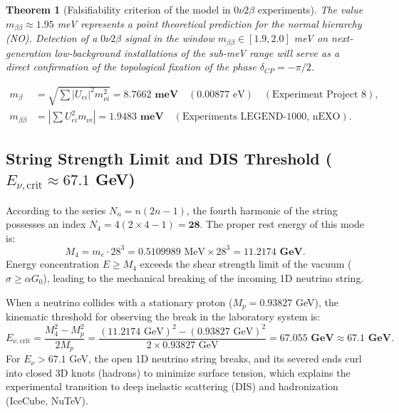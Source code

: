 \documentclass[12pt,a4paper]{article}
\newtheorem{theorem}{Theorem}
\begin{document}
	\begin{theorem}[Falsifiability criterion of the model in $0\nu 2\beta$ experiments]
	The value $m_{\beta\beta} \approx 1.95$ meV represents a point theoretical prediction for the normal hierarchy (NO). Detection of a $0\nu 2\beta$ signal in the window $m_{\beta\beta} \in [1.9, 2.0]$ meV on next-generation low-background installations of the sub-meV range will serve as a direct confirmation of the topological fixation of the phase $\delta_{CP} = -\pi/2$.
	\end{theorem}
	\begin{align}
	m_\beta &= \sqrt{\sum |U_{ei}|^2 m_{\nu i}^2} = \mathbf{8.7662 \text{ meV}} \quad (0.00877 \text{ eV}) \quad (\text{Experiment Project 8}), \\
	m_{\beta\beta} &= \left| \sum U_{ei}^2 m_{\nu i} \right| = \mathbf{1.9483 \text{ meV}} \quad (\text{Experiments LEGEND-1000, nEXO}).
	\end{align}
				
	\subsection{String Strength Limit and DIS Threshold ($E_{\nu, \text{crit}} \approx 67.1$ GeV)}
	According to the series $N_n = n(2n-1)$, the fourth harmonic of the string possesses an index $N_4 = 4(2 \times 4 - 1) = \mathbf{28}$. The proper rest energy of this mode is:
	\begin{equation}
	M_4 = m_e \cdot 28^3 = 0.5109989 \text{ MeV} \times 28^3 = \mathbf{11.2174 \text{ GeV}}.
	\end{equation}
	Energy concentration $E \ge M_4$ exceeds the shear strength limit of the vacuum ($\sigma \ge \alpha G_0$), leading to the mechanical breaking of the incoming 1D neutrino string. 
			
	When a neutrino collides with a stationary proton ($M_p = 0.93827$ GeV), the kinematic threshold for observing the break in the laboratory system is:
	\begin{equation}
	E_{\nu, \text{crit}} = \frac{M_4^2 - M_p^2}{2 M_p} = \frac{(11.2174 \text{ GeV})^2 - (0.93827 \text{ GeV})^2}{2 \times 0.93827 \text{ GeV}} = \mathbf{67.055 \text{ GeV}} \approx \mathbf{67.1 \text{ GeV}}.
	\end{equation}
	For $E_\nu > 67.1$ GeV, the open 1D neutrino string breaks, and its severed ends curl into closed 3D knots (hadrons) to minimize surface tension, which explains the experimental transition to deep inelastic scattering (DIS) and hadronization (IceCube, NuTeV).
				
\end{document}
